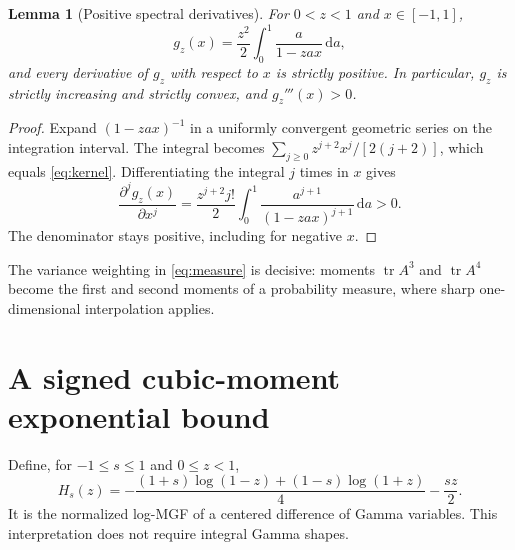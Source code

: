 \documentclass[11pt,letterpaper]{article}
\numberwithin{equation}{section}
\newtheorem{lemma}[theorem]{Lemma}
\theoremstyle{definition}\newtheorem{definition}[theorem]{Definition}
\theoremstyle{remark}\newtheorem{remark}[theorem]{Remark}
\newcommand{\tr}{\operatorname{tr}}
\newcommand{\dd}{\,\mathrm d}
\begin{document}
\begin{lemma}[Positive spectral derivatives]\label{lem:kernel}
For $0<z<1$ and $x\in[-1,1]$,
\begin{equation}\label{eq:kernel-integral}
 g_z(x)=\frac{z^2}{2}\int_0^1\frac{a}{1-zax}\dd a,
\end{equation}
and every derivative of $g_z$ with respect to $x$ is strictly positive.
In particular, $g_z$ is strictly increasing and strictly convex, and
$g_z'''(x)>0$.
\end{lemma}
\begin{proof}
Expand $(1-zax)^{-1}$ in a uniformly convergent geometric series on the
integration interval. The integral becomes
$\sum_{j\ge0}z^{j+2}x^j/[2(j+2)]$, which equals
\eqref{eq:kernel}. Differentiating the integral $j$ times in $x$ gives
\[
 \frac{\partial^j g_z(x)}{\partial x^j}
 =\frac{z^{j+2}j!}{2}
   \int_0^1\frac{a^{j+1}}{(1-zax)^{j+1}}\dd a>0.
\]
The denominator stays positive, including for negative $x$.
\end{proof}

The variance weighting in \eqref{eq:measure} is decisive: moments
$\tr A^3$ and $\tr A^4$ become the first and second moments of a
probability measure, where sharp one-dimensional interpolation applies.

\section{A signed cubic-moment exponential bound}

Define, for $-1\le s\le1$ and $0\le z<1$,
\begin{equation}\label{eq:H}
 H_s(z)=-\frac{(1+s)\log(1-z)+(1-s)\log(1+z)}4-\frac{sz}{2}.
\end{equation}
It is the normalized log-MGF of a centered difference of Gamma
variables. This interpretation does not require integral Gamma shapes.
\end{document}
